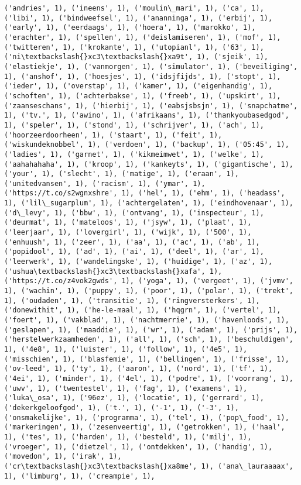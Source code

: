\documentclass{article}
\begin{document}
\begin{Verbatim}[commandchars=\\\{\}]
('andries', 1), ('ineens', 1), ('moulin\_mari', 1), ('ca', 1), ('libi', 1), ('bindweefsel', 1), ('ananninga', 1), ('erbij', 1), ('early', 1), ('eerdaags', 1), ('hoera', 1), ('marokko', 1), ('erachter', 1), ('spellen', 1), ('deislamiseren', 1), ('mof', 1), ('twitteren', 1), ('krokante', 1), ('utopianl', 1), ('63', 1), ('ni\textbackslash{}xc3\textbackslash{}xa9t', 1), ('sjeik', 1), ('elastiekje', 1), ('vanmorgen', 1), ('simulator', 1), ('beveiliging', 1), ('anshof', 1), ('hoesjes', 1), ('idsjfijds', 1), ('stopt', 1), ('ieder', 1), ('overstap', 1), ('kamer', 1), ('eigenhandig', 1), ('schoften', 1), ('achterbakse', 1), ('freeb', 1), ('upskirt', 1), ('zaanseschans', 1), ('hierbij', 1), ('eabsjsbsjn', 1), ('snapchatme', 1), ('tv.', 1), ('awino', 1), ('afrikaans', 1), ('thankyoubasedgod', 1), ('speler', 1), ('stond', 1), ('schrijver', 1), ('ach', 1), ('hoorzeerdoorheen', 1), ('staart', 1), ('feit', 1), ('wiskundeknobbel', 1), ('verdoen', 1), ('backup', 1), ('05:45', 1), ('ladies', 1), ('garnet', 1), ('kikmeimwet', 1), ('welke', 1), ('aahahahaha', 1), ('kroop', 1), ('kankeyts', 1), ('gigantische', 1), ('your', 1), ('slecht', 1), ('matige', 1), ('eraan', 1), ('unitedvansen', 1), ('racism', 1), ('ymar', 1), ('https://t.co/s2wgnxshre', 1), ('hel', 1), ('ehm', 1), ('headass', 1), ('lil\_sugarplum', 1), ('achtergelaten', 1), ('eindhovenaar', 1), ('d\_levy', 1), ('bbw', 1), ('ontvang', 1), ('inspecteur', 1), ('deurmat', 1), ('mateloos', 1), ('jsyw', 1), ('plaat', 1), ('leerjaar', 1), ('lovergirl', 1), ('wijk', 1), ('500', 1), ('enhuush', 1), ('zeer', 1), ('aa', 1), ('ac', 1), ('ab', 1), ('popidool', 1), ('ad', 1), ('ai', 1), ('deel', 1), ('ar', 1), ('leerwerk', 1), ('wandelingske', 1), ('huidige', 1), ('az', 1), ('ushua\textbackslash{}xc3\textbackslash{}xafa', 1), ('https://t.co/z4vok2gwds', 1), ('yoga', 1), ('vergeet', 1), ('jvmv', 1), ('wachin', 1), ('puppy', 1), ('poor', 1), ('polar', 1), ('trekt', 1), ('oudaden', 1), ('transitie', 1), ('ringversterkers', 1), ('donewithit', 1), ('he-le-maal', 1), ('hqgrn', 1), ('vertel', 1), ('foert', 1), ('vakblad', 1), ('nachtmerrie', 1), ('havenloods', 1), ('geslapen', 1), ('maaddie', 1), ('wr', 1), ('adam', 1), ('prijs', 1), ('herstelwerkzaamheden', 1), ('all', 1), ('sch', 1), ('beschuldigen', 1), ('4e8', 1), ('luister', 1), ('follow', 1), ('4e5', 1), ('misschien', 1), ('blasfemie', 1), ('bellingen', 1), ('frisse', 1), ('ov-leed', 1), ('ty', 1), ('aaron', 1), ('nord', 1), ('tf', 1), ('4ei', 1), ('minder', 1), ('4el', 1), ('podre', 1), ('voorrang', 1), ('uwv', 1), ('twentestel', 1), ('fag', 1), ('examens', 1), ('luka\_osa', 1), ('96ez', 1), ('locatie', 1), ('gerrard', 1), ('dekerkgeloofgod', 1), ('t.', 1), ('-1', 1), ('-3', 1), ('onsmakelijke', 1), ('programma', 1), ('tel', 1), ('pop\_food', 1), ('markeringen', 1), ('zesenveertig', 1), ('getrokken', 1), ('haal', 1), ('tes', 1), ('harden', 1), ('besteld', 1), ('milj', 1), ('vroeger', 1), ('dietzel', 1), ('ontdekken', 1), ('handig', 1), ('movedon', 1), ('irak', 1), ('cr\textbackslash{}xc3\textbackslash{}xa8me', 1), ('ana\_lauraaaax', 1), ('limburg', 1), ('creampie', 1), 
\end{Verbatim}
\end{document}
